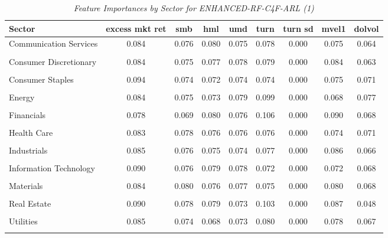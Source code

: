            \begin{table}[ht]
            \centering
            \caption{\textit{Feature Importances by Sector for ENHANCED-RF-C4F-ARL (1)}}
            \label{tab:feature_importance_enhanced-rf-c4f-arl_1}
            \begin{tabular}{lcccccccc}
            \toprule
            Sector & excess mkt ret & smb & hml & umd & turn & turn sd & mvel1 & dolvol \\
            \midrule
            Communication Services & 0.084 & 0.076 & 0.080 & 0.075 & 0.078 & 0.000 & 0.075 & 0.064 \\\\
Consumer Discretionary & 0.084 & 0.075 & 0.077 & 0.078 & 0.079 & 0.000 & 0.084 & 0.063 \\\\
Consumer Staples & 0.094 & 0.074 & 0.072 & 0.074 & 0.074 & 0.000 & 0.075 & 0.071 \\\\
Energy & 0.084 & 0.075 & 0.073 & 0.079 & 0.099 & 0.000 & 0.068 & 0.077 \\\\
Financials & 0.078 & 0.069 & 0.080 & 0.076 & 0.106 & 0.000 & 0.090 & 0.068 \\\\
Health Care & 0.083 & 0.078 & 0.076 & 0.076 & 0.076 & 0.000 & 0.074 & 0.071 \\\\
Industrials & 0.085 & 0.076 & 0.075 & 0.074 & 0.077 & 0.000 & 0.086 & 0.066 \\\\
Information Technology & 0.090 & 0.076 & 0.079 & 0.078 & 0.072 & 0.000 & 0.072 & 0.068 \\\\
Materials & 0.084 & 0.080 & 0.076 & 0.077 & 0.075 & 0.000 & 0.080 & 0.068 \\\\
Real Estate & 0.090 & 0.078 & 0.079 & 0.073 & 0.103 & 0.000 & 0.087 & 0.048 \\\\
Utilities & 0.085 & 0.074 & 0.068 & 0.073 & 0.080 & 0.000 & 0.078 & 0.067 \\\\
            \bottomrule
            \end{tabular}%
            \end{table}